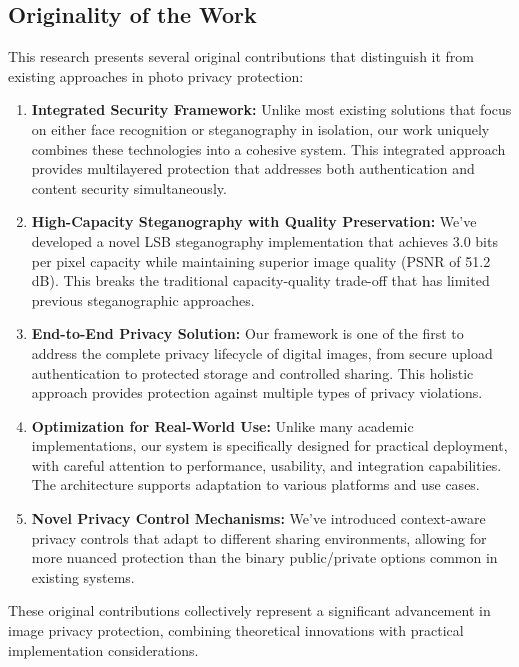 \documentclass[pdflatex,sn-mathphys-num]{sn-jnl}%
\theoremstyle{thmstyleone}%
\theoremstyle{thmstyletwo}%
\theoremstyle{thmstylethree}%
\begin{document}
\subsection{Originality of the Work}

This research presents several original contributions that distinguish it from existing approaches in photo privacy protection:

\begin{enumerate}
    \item \textbf{Integrated Security Framework:} Unlike most existing solutions that focus on either face recognition or steganography in isolation, our work uniquely combines these technologies into a cohesive system. This integrated approach provides multilayered protection that addresses both authentication and content security simultaneously.
    
    \item \textbf{High-Capacity Steganography with Quality Preservation:} We've developed a novel LSB steganography implementation that achieves 3.0 bits per pixel capacity while maintaining superior image quality (PSNR of 51.2 dB). This breaks the traditional capacity-quality trade-off that has limited previous steganographic approaches.
    
    \item \textbf{End-to-End Privacy Solution:} Our framework is one of the first to address the complete privacy lifecycle of digital images, from secure upload authentication to protected storage and controlled sharing. This holistic approach provides protection against multiple types of privacy violations.
    
    \item \textbf{Optimization for Real-World Use:} Unlike many academic implementations, our system is specifically designed for practical deployment, with careful attention to performance, usability, and integration capabilities. The architecture supports adaptation to various platforms and use cases.
    
    \item \textbf{Novel Privacy Control Mechanisms:} We've introduced context-aware privacy controls that adapt to different sharing environments, allowing for more nuanced protection than the binary public/private options common in existing systems.
\end{enumerate}

These original contributions collectively represent a significant advancement in image privacy protection, combining theoretical innovations with practical implementation considerations.
\end{document}
